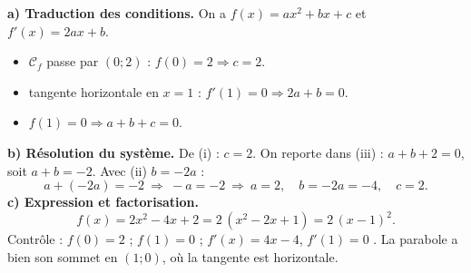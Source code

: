 \documentclass[11pt,a4paper]{article}
\begin{document}
\begin{corr}[3 --- Reconstituer $f(x)=ax^2+bx+c$]
\textbf{a) Traduction des conditions.} On a $f(x)=ax^2+bx+c$ et $f'(x)=2ax+b$.
\begin{itemize}[leftmargin=6mm,itemsep=1pt]
\item[(i)] $\mathcal{C}_f$ passe par $(0;2)$ : $f(0)=2\Rightarrow c=2$.
\item[(ii)] tangente horizontale en $x=1$ : $f'(1)=0\Rightarrow 2a+b=0$.
\item[(iii)] $f(1)=0\Rightarrow a+b+c=0$.
\end{itemize}
\textbf{b) Résolution du système.} De (i) : $c=2$. On reporte dans (iii) : $a+b+2=0$, soit $a+b=-2$. Avec (ii) $b=-2a$ :
\[
a+(-2a)=-2\ \Longrightarrow\ -a=-2\ \Longrightarrow\ a=2,\quad b=-2a=-4,\quad c=2.
\]
\textbf{c) Expression et factorisation.}
\[
f(x)=2x^2-4x+2=2\,(x^2-2x+1)=\boxed{2\,(x-1)^2}.
\]
Contrôle : $f(0)=2$ \checkmark ; $f(1)=0$ \checkmark ; $f'(x)=4x-4$, $f'(1)=0$ \checkmark. La parabole a bien son sommet en $(1;0)$, où la tangente est horizontale.
\end{corr}
\end{document}
